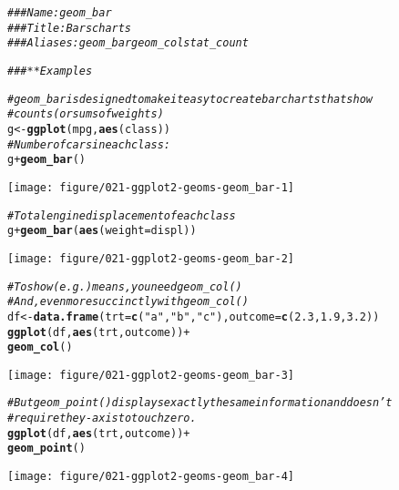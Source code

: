 \documentclass[a4paper,titlepage]{tufte-handout}\usepackage[]{graphicx}\usepackage[]{color}
\makeatletter
\def\maxwidth{ %
  \ifdim\Gin@nat@width>\linewidth
    \linewidth
  \else
    \Gin@nat@width
  \fi
}
\newcommand{\hlnum}[1]{\textcolor[rgb]{0.686,0.059,0.569}{#1}}%
\newcommand{\hlstr}[1]{\textcolor[rgb]{0.192,0.494,0.8}{#1}}%
\newcommand{\hlcom}[1]{\textcolor[rgb]{0.678,0.584,0.686}{\textit{#1}}}%
\newcommand{\hlopt}[1]{\textcolor[rgb]{0,0,0}{#1}}%
\newcommand{\hlstd}[1]{\textcolor[rgb]{0.345,0.345,0.345}{#1}}%
\newcommand{\hlkwb}[1]{\textcolor[rgb]{0.69,0.353,0.396}{#1}}%
\newcommand{\hlkwc}[1]{\textcolor[rgb]{0.333,0.667,0.333}{#1}}%
\newcommand{\hlkwd}[1]{\textcolor[rgb]{0.737,0.353,0.396}{\textbf{#1}}}%
\newenvironment{kframe}{%
 \def\at@end@of@kframe{}%
 \ifinner\ifhmode%
  \def\at@end@of@kframe{\end{minipage}}%
  \begin{minipage}{\columnwidth}%
 \fi\fi%
 \def\FrameCommand##1{\hskip\@totalleftmargin \hskip-\fboxsep
 \colorbox{shadecolor}{##1}\hskip-\fboxsep
     \hskip-\linewidth \hskip-\@totalleftmargin \hskip\columnwidth}%
 \MakeFramed {\advance\hsize-\width
   \@totalleftmargin\z@ \linewidth\hsize
   \@setminipage}}%
 {\par\unskip\endMakeFramed%
 \at@end@of@kframe}
\newenvironment{knitrout}{}{} %
\makeatother
\begin{document}
\begin{knitrout}
\color{fgcolor}\begin{kframe}
\begin{alltt}
\hlcom{### Name: geom_bar}
\hlcom{### Title: Bars charts}
\hlcom{### Aliases: geom_bar geom_col stat_count}

\hlcom{### ** Examples}

\hlcom{# geom_bar is designed to make it easy to create bar charts that show}
\hlcom{# counts (or sums of weights)}
\hlstd{g} \hlkwb{<-} \hlkwd{ggplot}\hlstd{(mpg,} \hlkwd{aes}\hlstd{(class))}
\hlcom{# Number of cars in each class:}
\hlstd{g} \hlopt{+} \hlkwd{geom_bar}\hlstd{()}
\end{alltt}
\end{kframe}
\texttt{[image: figure/021-ggplot2-geoms-geom\_bar-1]} 
\begin{kframe}\begin{alltt}
\hlcom{# Total engine displacement of each class}
\hlstd{g} \hlopt{+} \hlkwd{geom_bar}\hlstd{(}\hlkwd{aes}\hlstd{(}\hlkwc{weight} \hlstd{= displ))}
\end{alltt}
\end{kframe}
\texttt{[image: figure/021-ggplot2-geoms-geom\_bar-2]} 
\begin{kframe}\begin{alltt}
\hlcom{# To show (e.g.) means, you need geom_col()}
\hlcom{# And, even more succinctly with geom_col()}
\hlstd{df} \hlkwb{<-} \hlkwd{data.frame}\hlstd{(}\hlkwc{trt} \hlstd{=} \hlkwd{c}\hlstd{(}\hlstr{"a"}\hlstd{,} \hlstr{"b"}\hlstd{,} \hlstr{"c"}\hlstd{),} \hlkwc{outcome} \hlstd{=} \hlkwd{c}\hlstd{(}\hlnum{2.3}\hlstd{,} \hlnum{1.9}\hlstd{,} \hlnum{3.2}\hlstd{))}
\hlkwd{ggplot}\hlstd{(df,} \hlkwd{aes}\hlstd{(trt, outcome))} \hlopt{+}
  \hlkwd{geom_col}\hlstd{()}
\end{alltt}
\end{kframe}
\texttt{[image: figure/021-ggplot2-geoms-geom\_bar-3]} 
\begin{kframe}\begin{alltt}
\hlcom{# But geom_point() displays exactly the same information and doesn't}
\hlcom{# require the y-axis to touch zero.}
\hlkwd{ggplot}\hlstd{(df,} \hlkwd{aes}\hlstd{(trt, outcome))} \hlopt{+}
  \hlkwd{geom_point}\hlstd{()}
\end{alltt}
\end{kframe}
\texttt{[image: figure/021-ggplot2-geoms-geom\_bar-4]} 
\begin{kframe}\begin{alltt}

\end{alltt}
\end{kframe}
\end{knitrout}
\end{document}
